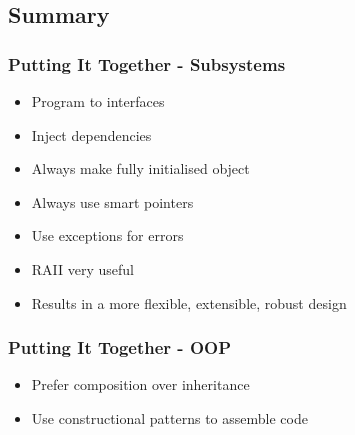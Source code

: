 \subsection{Summary}\label{summary}

\subsubsection{Putting It Together -
Subsystems}\label{putting-it-together---subsystems}

\begin{itemize}
\itemsep1pt\parskip0pt
\item
  Program to interfaces
\item
  Inject dependencies
\item
  Always make fully initialised object
\item
  Always use smart pointers
\item
  Use exceptions for errors
\item
  RAII very useful
\item
  Results in a more flexible, extensible, robust design
\end{itemize}

\subsubsection{Putting It Together -
OOP}\label{putting-it-together---oop}

\begin{itemize}
\itemsep1pt\parskip0pt
\item
  Prefer composition over inheritance
\item
  Use constructional patterns to assemble code
\end{itemize}
